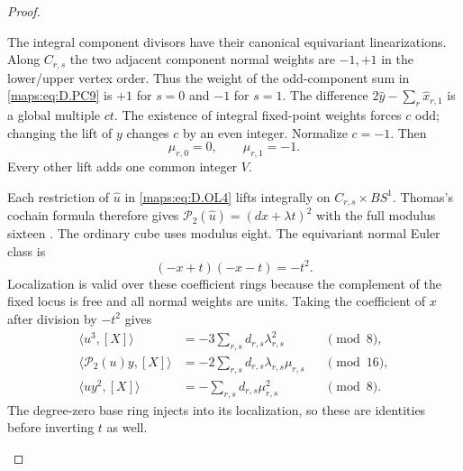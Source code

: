 \begin{proof}
\begin{enumerate}[label=\arabic*.,leftmargin=*]
The integral component divisors have their canonical equivariant
linearizations. Along $C_{r,s}$ the two adjacent component normal
weights are $-1,+1$ in the lower/upper vertex order. Thus the weight
of the odd-component sum in \eqref{maps:eq:D.PC9} is $+1$ for $s=0$ and $-1$
for $s=1$. The difference
$2\widehat y-\sum_r\widehat x_{r,1}$ is a global multiple $ct$.
The existence of integral fixed-point weights forces $c$ odd;
changing the lift of $y$ changes $c$ by an even integer. Normalize
$c=-1$. Then
\[
                       \mu_{r,0}=0,\qquad
                       \mu_{r,1}=-1.                     \tag{D.OL8}\label{maps:eq:D.OL8}
\]
Every other lift adds one common integer $V$.

Each restriction of $\widehat u$ in \eqref{maps:eq:D.OL4} lifts integrally on
$C_{r,s}\times BS^1$. Thomas's cochain formula therefore gives
$\mathcal P_2(\widehat u)=(d x+\lambda t)^2$ with the full
modulus sixteen \cite[equations (2.1), (3.4), pp.267--268]{ffThomas56}.
The ordinary cube uses modulus eight. The equivariant normal Euler
class is
\[
                           (-x+t)(-x-t)=-t^2.
\]
Localization is valid over these coefficient rings because the
complement of the fixed locus is free and all normal weights are
units. Taking the coefficient of $x$ after division by $-t^2$ gives
\[
 \begin{aligned}
 \langle u^3,[X]\rangle&=-3\sum_{r,s}d_{r,s}\lambda_{r,s}^2
                                                        &&\pmod8,\\
 \langle\mathcal P_2(u)y,[X]\rangle
       &=-2\sum_{r,s}d_{r,s}\lambda_{r,s}\mu_{r,s}
                                                        &&\pmod{16},\\
 \langle uy^2,[X]\rangle&=-\sum_{r,s}d_{r,s}\mu_{r,s}^2
                                                        &&\pmod8.
 \end{aligned}                                             \tag{D.OL9}\label{maps:eq:D.OL9}
\]
The degree-zero base ring injects into its localization, so these
are identities before inverting $t$ as well.


\end{enumerate}
\end{proof}
